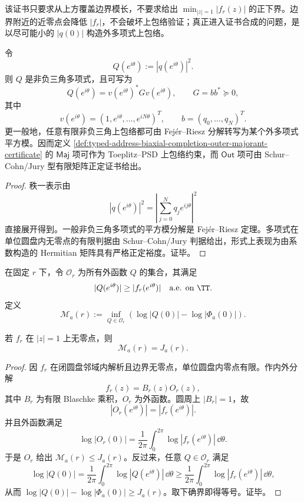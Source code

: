 该证书只要求从上方覆盖边界模长，不要求给出 \(\min_{|z|=1}|f_r(z)|\) 的正下界。边界附近的近零点会降低 \(|f_r|\)，不会破坏上包络验证；真正进入证书合成的问题，是以尽可能小的 \(|q(0)|\) 构造外多项式上包络。

\begin{proposition}\label{prop:typed-address-biaxial-completion-outer-majorant-toeplitz-psd}
令
\[
Q(e^{i\theta}):=|q(e^{i\theta})|^2.
\]
则 \(Q\) 是非负三角多项式，且可写为
\[
Q(e^{i\theta})
=
v(e^{i\theta})^*Gv(e^{i\theta}),
\qquad
G=bb^*\succeq0,
\]
其中
\[
v(e^{i\theta})=(1,e^{i\theta},\ldots,e^{iN\theta})^T,
\qquad
b=(q_0,\ldots,q_N)^T.
\]
更一般地，任意有限非负三角上包络都可由 Fej\'er--Riesz 分解转写为某个外多项式平方模。因而定义 \ref{def:typed-address-biaxial-completion-outer-majorant-certificate} 的 \(\mathsf{Maj}\) 项可作为 Toeplitz--PSD 上包络约束，而 \(\mathsf{Out}\) 项可由 Schur--Cohn/Jury 型有限矩阵正定证书给出。
\end{proposition}
\begin{proof}
秩一表示由
\[
|q(e^{i\theta})|^2
=
\left|\sum_{j=0}^{N}q_je^{ij\theta}\right|^2
\]
直接展开得到。一般非负三角多项式的平方模分解是 Fej\'er--Riesz 定理。多项式在单位圆盘内无零点的有限判据由 Schur--Cohn/Jury 判据给出，形式上表现为由系数构造的 Hermitian 矩阵具有严格正定裕度。证毕。
\end{proof}

\begin{definition}[连续外函数最优值]\label{def:typed-address-biaxial-completion-outer-majorant-optimum}
在固定 \(r\) 下，令 \(\mathcal O_r\) 为所有外函数 \(Q\) 的集合，其满足
\[
|Q(e^{i\theta})|\ge |f_r(e^{i\theta})|
\quad\text{a.e. on }\TT.
\]
定义
\[
\mathcal M_a(r)
:=
\inf_{Q\in\mathcal O_r}
\left(\log|Q(0)|-\log|\Phi_a(0)|\right).
\]
\end{definition}

\begin{proposition}\label{prop:typed-address-biaxial-completion-outer-optimum-equals-jensen}
若 \(f_r\) 在 \(|z|=1\) 上无零点，则
\[
\mathcal M_a(r)=J_a(r).
\]
\end{proposition}
\begin{proof}
因 \(f_r\) 在闭圆盘邻域内解析且边界无零点，单位圆盘内零点有限。作内外分解
\[
f_r(z)=B_r(z)O_r(z),
\]
其中 \(B_r\) 为有限 Blaschke 乘积，\(O_r\) 为外函数。圆周上 \(|B_r|=1\)，故
\[
|O_r(e^{i\theta})|=|f_r(e^{i\theta})|.
\]
并且外函数满足
\[
\log|O_r(0)|
=
\frac1{2\pi}\int_0^{2\pi}\log|f_r(e^{i\theta})|\,\dd\theta.
\]
于是 \(O_r\) 给出 \(\mathcal M_a(r)\le J_a(r)\)。反过来，任意 \(Q\in\mathcal O_r\) 满足
\[
\log|Q(0)|
=
\frac1{2\pi}\int_0^{2\pi}\log|Q(e^{i\theta})|\,\dd\theta
\ge
\frac1{2\pi}\int_0^{2\pi}\log|f_r(e^{i\theta})|\,\dd\theta,
\]
从而 \(\log|Q(0)|-\log|\Phi_a(0)|\ge J_a(r)\)。取下确界即得等号。证毕。
\end{proof}

